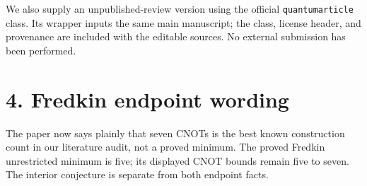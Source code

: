 \documentclass[11pt]{article}
\begin{document}
We also supply an unpublished-review version using the official
\texttt{quantumarticle} class. Its wrapper inputs the same main manuscript;
the class, license header, and provenance are included with the editable
sources. No external submission has been performed.

\section*{4. Fredkin endpoint wording}
The paper now says plainly that seven CNOTs is the best known construction
count in our literature audit, not a proved minimum. The proved Fredkin
unrestricted minimum is five; its displayed CNOT bounds remain five to
seven. The interior conjecture is separate from both endpoint facts.
\end{document}
